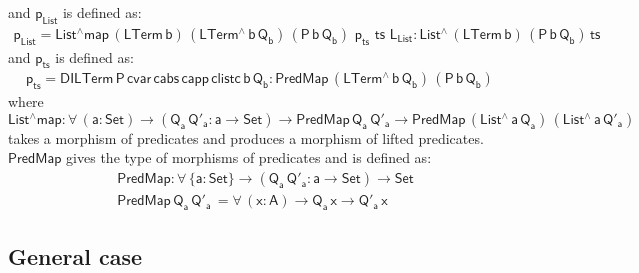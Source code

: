 \documentclass[acmsmall,screen,review,anonymous]{acmart}
\theoremstyle{definition}
\begin{document}
\noindent
and $\mathsf{p_{List}}$ is defined as:
\begin{multline*}
  \mathsf{p_{List} = List^{\wedge}map \, (LTerm\, b) \, (LTerm^{\wedge} \, b \, Q_b)\, 
    (P\,b\,Q_b)\, \,p_{ts} \,\, ts\,\, L_{List}  : List^{\wedge}\, (LTerm\,b) \, (P\,b\,Q_b) \, ts}
\end{multline*}
and $\mathsf{p_{ts}}$ is defined as:
\begin{multline*}
  \mathsf{
  p_{ts} = DILTerm\, P\, cvar\, cabs\, capp\, clistc\, b\, Q_b :  PredMap \,(LTerm^{\wedge}\, b\, Q_b) \, (P\,b\,Q_b)
  }
\end{multline*}
where 
\[\mathsf{List^{\wedge}map : \forall\, (a : Set) \to (Q_a \, Q'_a : a \to Set) 
  \to PredMap\,Q_a\,Q'_a \to PredMap \,(List^{\wedge}\, a\, Q_a)\, (List^{\wedge}\, a\, Q'_a)}\]
takes a morphism of predicates and produces a morphism of lifted predicates. 
$\mathsf{PredMap}$ gives the type of morphisms of predicates and is defined as: 
\begin{align*}
  &\mathsf{PredMap : \forall\, \{a : Set\} \to (Q_a \, Q'_a : a \to Set) \to Set } \\
  &\mathsf{PredMap \, Q_a\,Q'_a\, = \forall\, (x : A) \to Q_a\,x \to Q'_a\,x}
\end{align*}




\subsection{General case}

\end{document}
